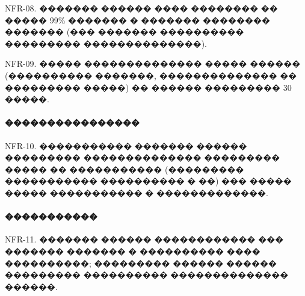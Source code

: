 \documentclass{G7-32}
\begin{document}
NFR-08. ������� ������ ���� �������� �� ����� 99\% ������� � ������� �������� ������� (��� ������� ���������� ��������� ��������������).  

NFR-09. ����� �������������� ����� ������ (���������� �������, �������������� �� ��������� �����) �� ������ ��������� 30 �����.

\paragraph{����������������}

NFR-10. ����������� ������� ������ ��������� �������������� ��������� ����� �� ����������� (��������� ����������� ���������� � ��) ��� ����� ����� ����������� � �������������.

\paragraph{�����������}

NFR-11. ������� ������ ������������ ��� ������� ������� � ���������� ���� ����������; ��������� ������ ������ ��������� ���������� �������������� ������.
\end{document}
